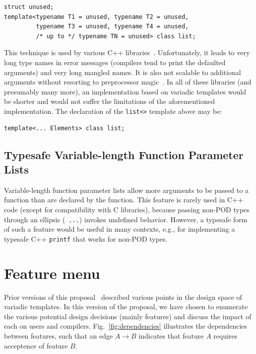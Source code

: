 \documentclass{article}
\begin{document}
\begin{verbatim}
struct unused;
template<typename T1 = unused, typename T2 = unused, 
         typename T3 = unused, typename T4 = unused, 
         /* up to */ typename TN = unused> class list;
\end{verbatim}

This technique is used by various C++ libraries~\cite{Tuples01,
Jarvi02, Gurtovoy02}. Unfortunately, it leads to very
long type names in error messages (compilers tend to print the
defaulted arguments) and very long mangled names. It is also not
scalable to additional arguments without resorting to preprocessor
magic~\cite{Preprocessor01}. In all of these libraries (and presumably
many more), an implementation based on variadic templates would be
shorter and would not suffer the limitations of the aforementioned
implementation. The declaration of the {\tt list<>} template above may
be:
\begin{verbatim}
template<... Elements> class list;
\end{verbatim}

\subsection{Typesafe Variable-length Function Parameter Lists}
Variable-length function parameter lists allow more arguments to be
passed to a function than are declared by the function. This feature
is rarely used in C++ code (except for compatibility with C
libraries), because passing non-POD types through an ellipsis ({\tt
  ...}) invokes undefined behavior. However, a typesafe form of such a
feature would be useful in many contexts, e.g., for implementing a
typesafe C++ {\tt printf} that works for non-POD types.

\section{Feature menu}
Prior versions of this proposal~\cite{GPJ03,GJP04a} described various
points in the design space of variadic templates. In this version of
the proposal, we have chosen to enumerate the various potential design
decisions (mainly features) and discuss the impact of each on users
and compilers. Fig.~\ref{fig:dependencies} illustrates the
dependencies between features, such that an edge $A \rightarrow B$
indicates that feature $A$ requires acceptence of feature $B$.
\end{document}
